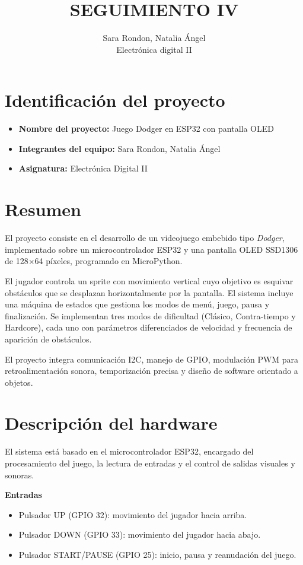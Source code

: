\documentclass[12pt]{article}
\title{SEGUIMIENTO IV}
\author{Sara Rondon, Natalia Ángel\\ Electrónica digital II}
\date{}
\begin{document}
\maketitle
\tableofcontents
\newpage

\section{Identificación del proyecto}
\begin{itemize}
    \item \textbf{Nombre del proyecto:} Juego Dodger en ESP32 con pantalla OLED
    \item \textbf{Integrantes del equipo:} Sara Rondon, Natalia Ángel
    \item \textbf{Asignatura:} Electrónica Digital II
\end{itemize}

\section{Resumen}
El proyecto consiste en el desarrollo de un videojuego embebido tipo \textit{Dodger}, implementado sobre un microcontrolador ESP32 y una pantalla OLED SSD1306 de 128×64 píxeles, programado en MicroPython.

El jugador controla un sprite con movimiento vertical cuyo objetivo es esquivar obstáculos que se desplazan horizontalmente por la pantalla. El sistema incluye una máquina de estados que gestiona los modos de menú, juego, pausa y finalización. Se implementan tres modos de dificultad (Clásico, Contra-tiempo y Hardcore), cada uno con parámetros diferenciados de velocidad y frecuencia de aparición de obstáculos.

El proyecto integra comunicación I2C, manejo de GPIO, modulación PWM para retroalimentación sonora, temporización precisa y diseño de software orientado a objetos.

\section{Descripción del hardware}

El sistema está basado en el microcontrolador ESP32, encargado del procesamiento del juego, la lectura de entradas y el control de salidas visuales y sonoras.

\textbf{Entradas}
\begin{itemize}
    \item Pulsador UP (GPIO 32): movimiento del jugador hacia arriba.
    \item Pulsador DOWN (GPIO 33): movimiento del jugador hacia abajo.
    \item Pulsador START/PAUSE (GPIO 25): inicio, pausa y reanudación del juego.
\end{itemize}
\end{document}
